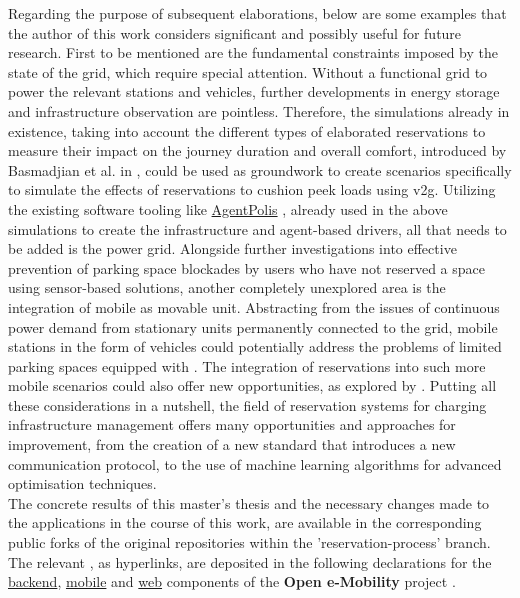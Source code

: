 \noindent Regarding the purpose of subsequent elaborations, below are some examples that the author of this work considers significant and possibly useful for future research. 
First to be mentioned are the fundamental constraints imposed by the state of the grid, which require special attention. Without a functional grid to power the relevant stations and vehicles, further developments in energy storage and infrastructure observation are pointless.
Therefore, the simulations already in existence, taking into account the different types of elaborated reservations to measure their impact on the journey duration and overall comfort, introduced by Basmadjian et al. in \cite{basmadjian_reference_2020,basmadjian_interoperable_2019}, could be used as groundwork to create scenarios specifically to simulate the effects of reservations to cushion peek loads using \acrshort{v2g}.
Utilizing the existing software tooling like \href{https://github.com/aicenter/agentpolis}{AgentPolis} \cite{noauthor_agentpolis_2022}, already used in the above simulations to create the infrastructure and agent-based drivers, all that needs to be added is the power grid.
Alongside further investigations into effective prevention of parking space blockades by users who have not reserved a space using sensor-based solutions, another completely unexplored area is the integration of mobile  as movable unit.
Abstracting from the issues of continuous power demand from stationary units permanently connected to the grid, mobile stations in the form of vehicles could potentially address the problems of limited parking spaces equipped with . The integration of reservations into such more mobile scenarios could also offer new opportunities, as explored by \cite{zhang_mobile_2020}.
Putting all these considerations in a nutshell, the field of reservation systems for charging infrastructure management offers many opportunities and approaches for improvement, from the creation of a new standard that introduces a new communication protocol, to the use of machine learning algorithms for advanced optimisation techniques. \\
The concrete results of this master's thesis and the necessary changes made to the applications in the course of this work, are available in the corresponding public forks of the original repositories within the 'reservation-process' branch. The relevant , as hyperlinks, are deposited in the following declarations for the \href{https://github.com/JulianHBuecher/ev-server/tree/reservation-process}{backend}, \href{https://github.com/JulianHBuecher/ev-mobile/tree/reservation-process}{mobile} and \href{https://github.com/JulianHBuecher/ev-dashboard/tree/reservation-process}{web} components of the \textbf{Open e-Mobility} project \cite{noauthor_github_nodate,noauthor_github_nodate-1,noauthor_github_nodate-2}. 
